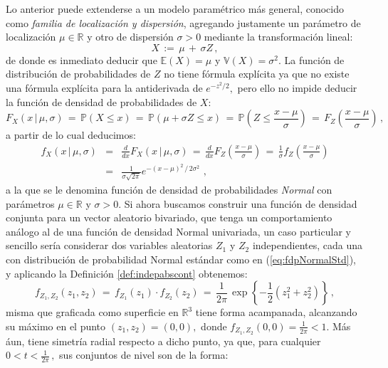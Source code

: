 \documentclass[spanish,10pt,letterpaper]{article}
\newcommand{\prob}{\mathbb{P}}
\newcommand{\esper}{\mathbb{E}}
\newcommand{\vari}{\mathbb{V}}
\newcommand{\Runo}{\mathbb{R}}
\begin{document}
Lo anterior puede extenderse a un modelo paramétrico más general, conocido como \textit{familia de localización y dispersión}, agregando justamente un parámetro de localización $\mu\in\Runo$ y otro de dispersión $\sigma>0$ mediante la transformación lineal:
\begin{equation}\label{eq:transfLocDisp}
    X \,:=\, \mu \,+\, \sigma Z\,,
\end{equation}    
de donde es inmediato deducir que $\esper(X)=\mu$ y $\vari(X)=\sigma^2.$ La función de distribución de probabilidades de $Z$ no tiene fórmula explícita ya que no existe una fórmula explícita para la antiderivada de $e^{-z^2/2},$ pero ello no impide deducir la función de densidad de probabilidades de $X:$
\begin{equation*}
    F_X(x\,|\,\mu,\sigma) \,=\, \prob(X\leq x) \,=\, \prob(\mu+\sigma Z\leq x) \,=\, \prob\left(Z\leq \frac{x-\mu}{\sigma}\right) \,=\, F_Z\left(\frac{x-\mu}{\sigma}\right)\,,
\end{equation*}
a partir de lo cual deducimos:
\begin{eqnarray}\label{eq:fdpNormal}
    f_X(x\,|\,\mu,\sigma) &=& \frac{d}{dx}F_X(x\,|\,\mu,\sigma) \,=\, \frac{d}{dx}F_Z\left(\frac{x-\mu}{\sigma}\right) \,=\, \frac{1}{\sigma}f_Z\left(\frac{x-\mu}{\sigma}\right)  \nonumber \\
                          &=& \frac{1}{\sigma\sqrt{2\pi}}e^{-(x-\mu)^2\,/\,2\sigma^2}\,\,,
\end{eqnarray}
a la que se le denomina función de densidad de probabilidades \textit{Normal} con parámetros $\mu\in\Runo$ y $\sigma>0.$ Si ahora buscamos construir una función de densidad conjunta para un vector aleatorio bivariado, que tenga un comportamiento análogo al de una función de densidad Normal univariada, un caso particular y sencillo sería considerar dos variables aleatorias $Z_1$ y $Z_2$ independientes, cada una con distribución de probabilidad Normal estándar como en (\ref{eq:fdpNormalStd}), y aplicando la Definición \ref{def:indepabscont} obtenemos:
\begin{equation}\label{eq:NormalStd2indep}
    f_{Z_1,Z_2}(z_1,z_2) \,=\, f_{Z_1}(z_1)\cdot f_{Z_2}(z_2) \,=\, \frac{1}{2\pi}\,\exp\left\{-\frac{1}{2}\left(z_1^2+z_2^2\right)\right\}\,,
\end{equation}
misma que graficada como superficie en $\Runo^3$ tiene forma acampanada, alcanzando su máximo en el punto $(z_1,z_2)=(0,0),$ donde $f_{Z_1,Z_2}(0,0)=\frac{1}{2\pi}<1.$ Más áun, tiene simetría radial respecto a dicho punto, ya que, para cualquier $0<t<\frac{1}{2\pi}\,,$ sus conjuntos de nivel son de la forma:
\end{document}
